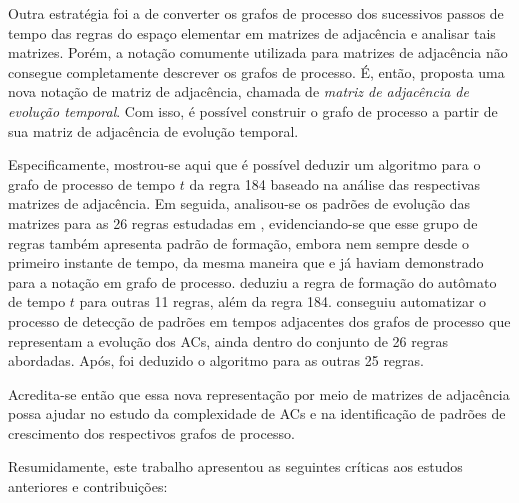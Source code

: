 \documentclass[12pt,a4paper]{article}
\begin{document}
Outra estratégia foi a de converter os grafos de processo dos sucessivos
passos de tempo das regras do espaço elementar em matrizes de adjacência e analisar
tais matrizes. Porém, a notação comumente utilizada para matrizes de adjacência
não consegue completamente descrever os grafos de processo. É, então, proposta uma
nova notação de matriz de adjacência, chamada de \textit{matriz de
adjacência de evolução temporal}. Com isso, é possível construir o
grafo de processo a partir de sua matriz de adjacência de evolução temporal.

Especificamente, mostrou-se aqui que é possível deduzir um algoritmo para o
grafo de processo de tempo $t$ da regra 184 baseado na análise das respectivas
matrizes de adjacência. Em seguida, analisou-se
os padrões de evolução das matrizes para as 26 regras estudadas em
, evidenciando-se que esse grupo de regras
também apresenta padrão de formação, embora nem sempre desde o primeiro
instante de tempo, da mesma maneira que  e
 já haviam demonstrado para a notação em grafo de processo.
 deduziu a regra de formação do autômato de
tempo $t$ para outras 11 regras, além da regra 184. 
conseguiu automatizar o processo de detecção de padrões em tempos adjacentes
dos grafos de processo que representam a evolução dos ACs, ainda dentro do
conjunto de 26 regras abordadas. Após, foi deduzido o algoritmo para as
outras 25 regras.

Acredita-se então que essa nova representação por meio de matrizes de
adjacência possa ajudar no estudo da complexidade de ACs e na identificação
de padrões de crescimento dos respectivos grafos de processo.

Resumidamente, este trabalho apresentou as seguintes críticas aos estudos
anteriores e contribuições:
\end{document}
